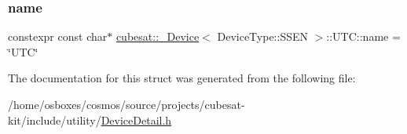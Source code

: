 \subsubsection{\texorpdfstring{name}{name}}
{\footnotesize\ttfamily constexpr const char$\ast$ \hyperlink{structcubesat_1_1__Device}{cubesat\+::\+\_\+\+Device}$<$ Device\+Type\+::\+S\+S\+EN $>$\+::U\+T\+C\+::name = \char`\"{}U\+TC\char`\"{}\hspace{0.3cm}{\ttfamily [static]}}



The documentation for this struct was generated from the following file\+:\begin{DoxyCompactItemize}
\item 
/home/osboxes/cosmos/source/projects/cubesat-\/kit/include/utility/\hyperlink{DeviceDetail_8h}{Device\+Detail.\+h}\end{DoxyCompactItemize}
